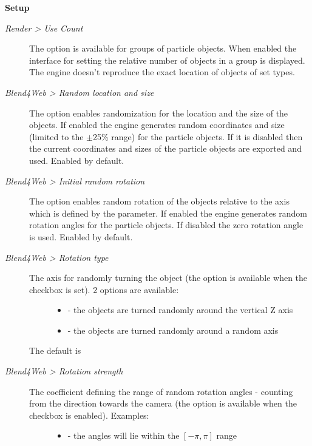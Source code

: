 \documentclass[a4paper,12pt,oneside]{sphinxmanual}
\begin{document}
\textbf{Setup}
\begin{description}
\item[{\emph{Render \textgreater{} Use Count}}] \leavevmode
The option is available for groups of particle objects. When enabled the interface for setting the relative number of objects in a group is displayed. The engine doesn't reproduce the exact location of objects of set types.

\item[{\emph{Blend4Web \textgreater{} Random location and size}}] \leavevmode
The option enables randomization for the location and the size of the objects. If enabled the engine generates random coordinates and size (limited to the \(\pm\)25\% range) for the particle objects. If it is disabled then the current coordinates and sizes of the particle objects are exported and used. Enabled by default.

\item[{\emph{Blend4Web \textgreater{} Initial random rotation}}] \leavevmode
The option enables random rotation of the objects relative to the axis which is defined by the  parameter. If enabled the engine generates random rotation angles for the particle objects. If disabled the zero rotation angle is used. Enabled by default.

\item[{\emph{Blend4Web \textgreater{} Rotation type}}] \leavevmode\begin{description}
\item[{The axis for randomly turning the object (the option is available when the  checkbox is set). 2 options are available:}] \leavevmode\begin{itemize}
\item {} 
 - the objects are turned randomly around the vertical Z axis

\item {} 
 - the objects are turned randomly around a random axis

\end{itemize}

\end{description}

The default is 

\item[{\emph{Blend4Web \textgreater{} Rotation strength}}] \leavevmode\begin{description}
\item[{The coefficient defining the range of random rotation angles - counting from the direction towards the camera (the option is available when the  checkbox is enabled). Examples:}] \leavevmode\begin{itemize}
\item {} 
 - the angles will lie within the \([-\pi, \pi]\) range


\end{itemize}
\end{description}
\end{description}
\end{document}
